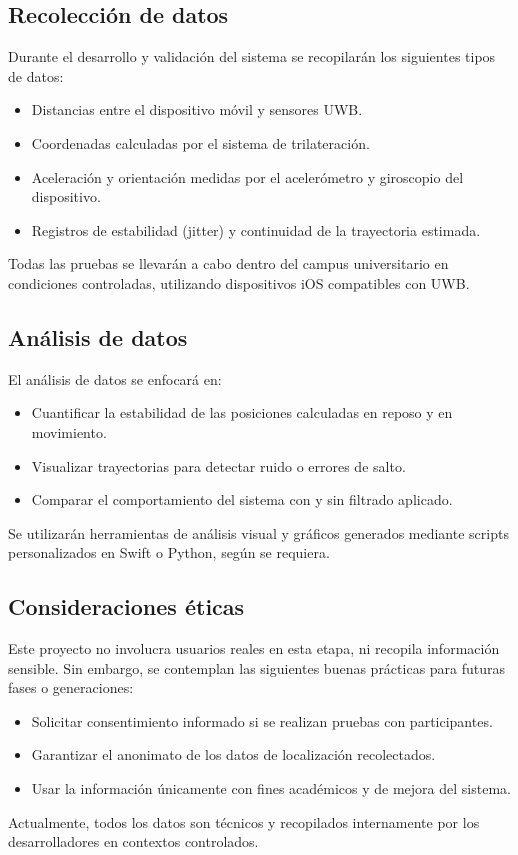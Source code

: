 \subsection{Recolección de datos}

Durante el desarrollo y validación del sistema se recopilarán los siguientes tipos de datos:

\begin{itemize}
    \item Distancias entre el dispositivo móvil y sensores UWB.
    \item Coordenadas calculadas por el sistema de trilateración.
    \item Aceleración y orientación medidas por el acelerómetro y giroscopio del dispositivo.
    \item Registros de estabilidad (jitter) y continuidad de la trayectoria estimada.
\end{itemize}

Todas las pruebas se llevarán a cabo dentro del campus universitario en condiciones controladas, utilizando dispositivos iOS compatibles con UWB.

\subsection{Análisis de datos}

El análisis de datos se enfocará en:

\begin{itemize}
    \item Cuantificar la estabilidad de las posiciones calculadas en reposo y en movimiento.
    \item Visualizar trayectorias para detectar ruido o errores de salto.
    \item Comparar el comportamiento del sistema con y sin filtrado aplicado.
\end{itemize}

Se utilizarán herramientas de análisis visual y gráficos generados mediante scripts personalizados en Swift o Python, según se requiera.

\subsection{Consideraciones éticas}

Este proyecto no involucra usuarios reales en esta etapa, ni recopila información sensible. Sin embargo, se contemplan las siguientes buenas prácticas para futuras fases o generaciones:

\begin{itemize}
    \item Solicitar consentimiento informado si se realizan pruebas con participantes.
    \item Garantizar el anonimato de los datos de localización recolectados.
    \item Usar la información únicamente con fines académicos y de mejora del sistema.
\end{itemize}

Actualmente, todos los datos son técnicos y recopilados internamente por los desarrolladores en contextos controlados.
\newpage